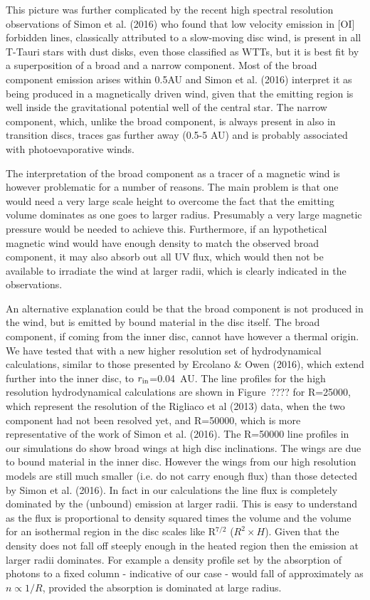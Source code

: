 \documentclass[10pt,fleqn,twoside]{article}
\begin{document}
This picture was further complicated by the recent high spectral
resolution observations of  Simon et al. (2016)  who found that low velocity
emission in [OI] forbidden lines, classically attributed to a
slow-moving disc wind, is present in all T-Tauri stars with
dust disks, even those classified as WTTs, but it is best fit
by a superposition of a broad and a narrow component. 
Most of the broad component emission
arises within 0.5AU and Simon et al. (2016) interpret it
as being produced in a magnetically driven wind, given that the
emitting region is well inside the gravitational 
potential well 
of the central star. The narrow component, which, unlike the broad
component, is always present in also in transition
discs, traces gas further away (0.5-5 AU) and is probably associated
with photoevaporative winds.

The interpretation of the broad component as a tracer of a magnetic
wind is however problematic for a number of reasons. The main problem
is that one would need a very large scale height to overcome the fact
that the emitting volume dominates as one goes to larger
radius. Presumably a very large magnetic pressure would be needed to
achieve this. Furthermore, if an hypothetical magnetic wind would
have enough density to match the observed broad component, it may also absorb
out all UV flux, which would then not be available to irradiate the
wind at larger radii, which is clearly indicated in the
observations. 

An alternative explanation could be that the broad
component is not produced in the wind, but is emitted by bound
material in the disc itself. The broad component, if coming from the
inner disc, cannot have however a thermal origin. We have tested that
with a new higher resolution set of hydrodynamical calculations,
similar to those presented by Ercolano \& Owen (2016), which
extend further into the inner disc, to $r_{\rm in}$=0.04~AU. The line
profiles for the high resolution hydrodynamical calculations are shown
in Figure~???? for R=25000, which represent the resolution of the
Rigliaco et al (2013) data, when the two component had not been
resolved yet, and R=50000, which is more representative
of the work of Simon et al. (2016). The
R=50000 line profiles in our simulations do show broad wings at high disc
inclinations. The wings are due to bound material in the inner
disc. However the wings from our high resolution models are still much
smaller (i.e. do not carry enough flux) than those detected by
Simon et al. (2016). In fact in our calculations the line flux
is completely dominated by the (unbound) emission at larger
radii. This is easy to understand as the flux is proportional to
density squared times the volume and the volume for an isothermal
region in the disc scales like R$^{7/2}$ ($R^2\times H$). Given that
the density does not fall off steeply enough in the heated region then
the emission at larger radii dominates. For 
example a density profile set by the absorption of photons to a fixed
column - indicative of our case - would fall of approximately as
$n\propto1/R$, provided the absorption is dominated at large radius.
\end{document}
